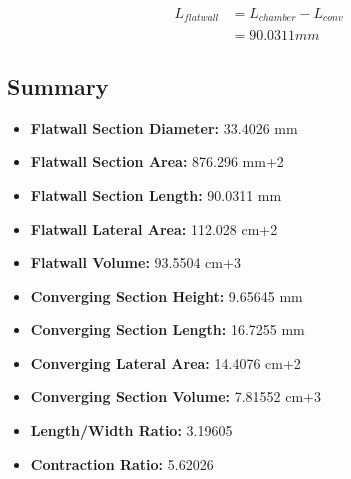 \documentclass[12pt]{report}
\begin{document}
\vspace{6 mm}

\begin{equation}
\begin{split}
\boldsymbol{\mathit{L_{flatwall}}} & = \boldsymbol{\mathit{L_{chamber}}} - \boldsymbol{\mathit{L_{conv}}}\\
 & = 90.0311 mm 
\end{split}
\end{equation}




\subsection{Summary}

\vspace{10 mm}

\begin{itemize}
	\item \textbf{Flatwall Section Diameter:} 33.4026 mm  
	\item \textbf{Flatwall Section Area:} 876.296 mm+2  
	\item \textbf{Flatwall Section Length:} 90.0311 mm  
	\item \textbf{Flatwall Lateral Area:} 112.028 cm+2  
	\item \textbf{Flatwall Volume:} 93.5504 cm+3  
\end{itemize}


\vspace{10 mm}

\begin{itemize}
	\item \textbf{Converging Section Height:} 9.65645 mm  
	\item \textbf{Converging Section Length:} 16.7255 mm  
	\item \textbf{Converging Lateral Area:} 14.4076 cm+2  
	\item \textbf{Converging Section Volume:} 7.81552 cm+3  
\end{itemize}


\vspace{6 mm}

\begin{itemize}
	\item \textbf{Length/Width Ratio:} 3.19605 
	\item \textbf{Contraction Ratio:} 5.62026 
\end{itemize}


\vspace{6 mm}
\end{document}
